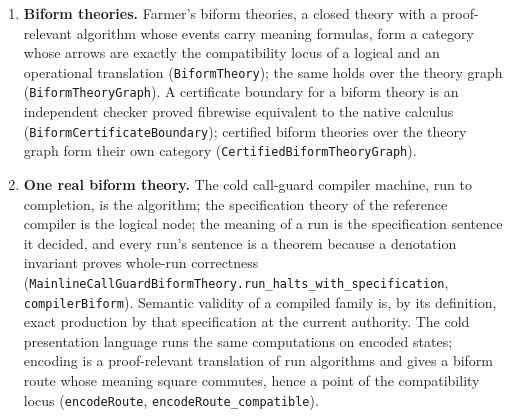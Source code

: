 \documentclass[11pt]{article}
\theoremstyle{definition}
\theoremstyle{remark}
\begin{document}
\begin{enumerate}
  institution (\nolinkurl{HOLFullDomainTheory.soundness}); the converse fails
  for the current excluded-middle-free calculus. Full set-based models
  validate an excluded-middle instance whose nonderivability has an
  independent Kripke countermodel
  (\nolinkurl{HOLFullDomainTheory.soundness_not_reflecting}). This distinguishes
  the stated proof calculus from this semantic profile, not every possible
  classical HOL calculus. Semantic theories enter the existing satisfying-model
  fibration. One theory requires two distinct elements of a base sort;
  a type-derived arrow interprets that sort by its endomorphism type.
  Two constant Boolean functions satisfy the translated axiom, and their
  model reduces along an actual arrow of the total model category
  (\nolinkurl{HOLFullDomainTheory.FunctionSort.transported}). A singleton
  model refutes the source axiom, proving that this object-theory restriction
  is not merely an unqualified HOL theorem. Thus framework, chosen axioms,
  satisfying model, and proof calculus remain separate in the consumer.
\item \textbf{Biform theories.}  Farmer's biform theories, a closed theory with
  a proof-relevant algorithm whose events carry meaning formulas, form a
  category whose arrows are exactly the compatibility locus of a logical and
  an operational translation (\texttt{BiformTheory}); the same holds over the
  theory graph (\texttt{BiformTheoryGraph}).  A certificate boundary for a
  biform theory is an independent checker proved fibrewise equivalent to the
  native calculus (\nolinkurl{BiformCertificateBoundary}); certified biform
  theories over the theory graph form their own category
  (\nolinkurl{CertifiedBiformTheoryGraph}).
\item \textbf{One real biform theory.}  The cold call-guard compiler machine,
  run to completion, is the algorithm; the specification theory of the
  reference compiler is the logical node; the meaning of a run is the
  specification sentence it decided, and every run's sentence is a theorem
  because a denotation invariant proves whole-run correctness
  (\nolinkurl{MainlineCallGuardBiformTheory.run_halts_with_specification},
  \texttt{compilerBiform}).  Semantic validity of a compiled family is, by
  its definition, exact production by that specification at the current
  authority.  The cold presentation language runs the same computations on
  encoded states; encoding is a proof-relevant translation of run algorithms
  and gives a biform route whose meaning square commutes, hence a point of
  the compatibility locus (\texttt{encodeRoute}, \nolinkurl{encodeRoute_compatible}).

\end{enumerate}
\end{document}
